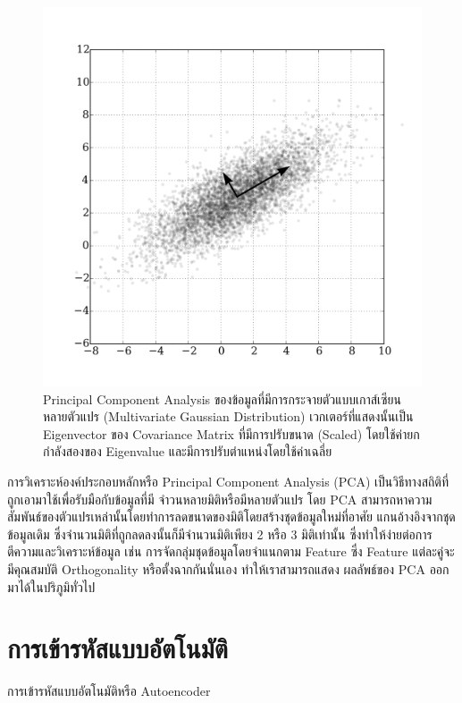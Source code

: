 \begin{figure}[H]
    \centering
    \includegraphics[width=0.8\linewidth]{fig/pca.png}
    \caption{Principal Component Analysis ของข้อมูลที่มีการกระจายตัวแบบเกาส์เซียนหลายตัวแปร (Multivariate Gaussian
    Distribution) เวกเตอร์ที่แสดงนั้นเป็น Eigenvector ของ Covariance Matrix ที่มีการปรับขนาด (Scaled) โดยใช้ค่ายกกำลังสองของ 
    Eigenvalue และมีการปรับตำแหน่งโดยใช้ค่าเฉลี่ย}
    \label{fig:pca}
\end{figure}

การวิเคราะห์องค์ประกอบหลักหรือ Principal Component Analysis (PCA) เป็นวิธีทางสถิติที่ถูกเอามาใช้เพื่อรับมือกับข้อมูลที่มี
จำวนหลายมิติหรือมีหลายตัวแปร โดย PCA สามารถหาความสัมพันธ์ของตัวแปรเหล่านั้นโดยทำการลดขนาดของมิติโดยสร้างชุดข้อมูลใหม่ที่อาศัย
แกนอ้างอิงจากชุดข้อมูลเดิม ซึ่งจำนวนมิติที่ถูกลดลงนั้นก็มีจำนวนมิติเพียง 2 หรือ 3 มิติเท่านั้น ซึ่งทำให้ง่ายต่อการตีความและวิเคราะห์ข้อมูล เช่น
การจัดกลุ่มชุดข้อมูลโดยจำแนกตาม Feature ซึ่ง Feature แต่ละคู่จะมีคุณสมบัติ Orthogonality หรือตั้งฉากกันนั่นเอง ทำให้เราสามารถแสดง
ผลลัพธ์ของ PCA ออกมาได้ในปริภูมิทั่วไป

\section{การเข้ารหัสแบบอัตโนมัติ}

การเข้ารหัสแบบอัตโนมัติหรือ Autoencoder

